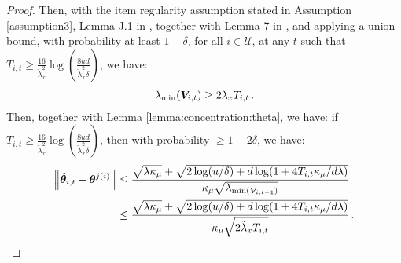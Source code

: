 \begin{proof}
    Then, with the item regularity assumption stated in Assumption \ref{assumption3}, Lemma J.1 in \cite{wang2024onlinea}, together with Lemma 7 in \cite{li2018online}, and applying a union bound, with probability at least $1-\delta$, for all $i\in\mathcal{U}$, at any $t$ such that $T_{i,t}\geq\frac{16}{\tilde{\lambda}_x^2}\log(\frac{8ud}{\tilde{\lambda}_x^2\delta})$, we have:
\begin{equation}
    \lambda_{\text{min}}(\boldsymbol{V}_{i,t})\geq2\tilde{\lambda}_x T_{i,t}\,.
    \label{min eigen}
\end{equation}
Then, together with Lemma \ref{lemma:concentration:theta}, we have: if $T_{i,t}\geq\frac{16}{\tilde{\lambda}_x^2}\log(\frac{8ud}{\tilde{\lambda}_x^2\delta})$, then with probability $\geq 1-2\delta$, we have:
\begin{align}
    \left\| \hat{\boldsymbol{\theta}}_{i,t}-\boldsymbol{\theta}^{j(i)} \right\|
    &\leq \frac{\sqrt{\lambda \kappa_\mu}+\sqrt{2\log(u/\delta)+d\log(1+4T_{i,t}\kappa_\mu/d\lambda)}}{\kappa_\mu{\sqrt{\lambda_{\text{min}(\boldsymbol{V}_{i,t-1})}}}}\notag\\
    &\leq \frac{\sqrt{\lambda \kappa_\mu}+\sqrt{2\log(u/\delta)+d\log(1+4T_{i,t}\kappa_\mu/d\lambda)}}{\kappa_\mu{\sqrt{2\tilde{\lambda}_x T_{i,t}}}}\notag\,.
\end{align}


\end{proof}
